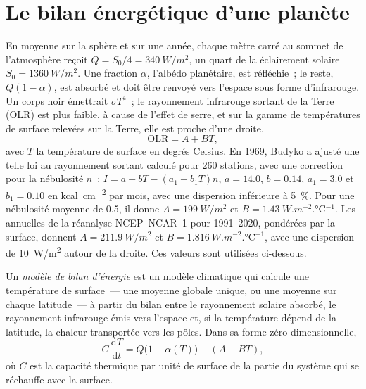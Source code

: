 \section{Le bilan énergétique d'une planète}\label{sec:b3:climate-models:zero-d}

En moyenne sur la sphère et sur une année, chaque mètre carré au sommet de
l'atmosphère reçoit $Q = S_0/4 = \qty{340}{W/m^2}$, un quart de la
éclairement solaire $S_0 = \qty{1360}{W/m^2}$. Une fraction $\alpha$, l'albédo
planétaire, est réfléchie~; le reste, $Q(1 - \alpha)$, est absorbé et
doit être renvoyé vers l'espace sous forme d'infrarouge. Un corps noir émettrait $\sigma
T^4$~; le rayonnement infrarouge sortant de la Terre (OLR) est plus faible, à cause de
l'effet de serre, et sur la gamme de températures de surface relevées sur
la Terre, elle est proche d'une droite,
\[
\text{OLR} = A + BT ,
\]
avec $T$ la température de surface en degrés Celsius. En 1969, Budyko a ajusté
une telle loi au rayonnement sortant calculé pour 260 stations, avec une correction pour
la nébulosité $n$~: $I = a + bT - (a_1 + b_1T)n$, $a = 14.0$, $b = 0.14$, $a_1 =
3.0$ et $b_1 = 0.10$ en \unit{kcal.cm^{-2}} par mois, avec une dispersion inférieure à
\qty{5}{\percent}. Pour une nébulosité moyenne de 0.5, il donne $A =
\qty{199}{W/m^2}$ et $B = \qty{1.43}{W.m^{-2}.\celsius^{-1}}$. Les  annuelles
de la réanalyse NCEP--NCAR~1 pour 1991--2020, pondérées par la surface,
donnent $A = \qty{211.9}{W/m^2}$ et $B = \qty{1.816}{W.m^{-2}.\celsius^{-1}}$,
avec une dispersion de \qty{10}{W/m^2} autour de la droite. Ces valeurs sont utilisées
ci-dessous.

\begin{definition}\label{def:b3:climate-models:ebm}
Un \emph{modèle de bilan d'énergie} est un modèle
climatique qui calcule une température de surface~--- une moyenne globale unique, ou une
moyenne sur chaque latitude~--- à partir du bilan entre le rayonnement solaire absorbé, le
rayonnement infrarouge émis vers l'espace et, si la température dépend de la latitude, la
chaleur transportée vers les pôles. Dans sa forme zéro-dimensionnelle,
\[
C\,\frac{\mathrm dT}{\mathrm dt} = Q\big(1 - \alpha(T)\big) - (A + BT) ,
\]
où $C$ est la capacité thermique par unité de surface de la partie du système qui
se réchauffe avec la surface.
\end{definition}

